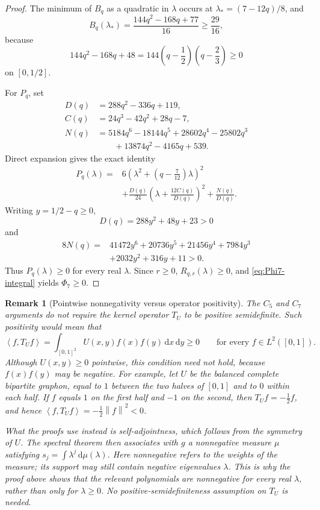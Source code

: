 \documentclass[11pt]{article}
\newtheorem{remark}[theorem]{Remark}
\newcommand{\ip}[2]{\left\langle #1,#2\right\rangle}
\newcommand{\norm}[1]{\left\lVert #1\right\rVert}
\newcommand{\dd}{\,\mathrm d}
\begin{document}
\begin{proof}
The minimum of \(B_q\) as a quadratic in \(\lambda\) occurs at
\(\lambda_*=(7-12q)/8\), and
\[
 B_q(\lambda_*)=\frac{144q^2-168q+77}{16}\ge\frac{29}{16},
\]
because
\[
 144q^2-168q+48=144\left(q-\frac12\right)
                         \left(q-\frac23\right)\ge0
\]
on \([0,1/2]\).

For \(P_q\), set
\begin{align*}
 D(q)&=288q^2-336q+119,\\
 C(q)&=24q^3-42q^2+28q-7,\\
 N(q)&=5184q^6-18144q^5+28602q^4-25802q^3\\
     &\qquad+13874q^2-4165q+539.
\end{align*}
Direct expansion gives the exact identity
\begin{equation}\label{eq:Pq-SOS}
\begin{aligned}
 P_q(\lambda)
 ={}&6\left(\lambda^2+\left(q-\frac7{12}\right)\lambda\right)^2\\
 &+\frac{D(q)}{24}
   \left(\lambda+\frac{12C(q)}{D(q)}\right)^2
 +\frac{N(q)}{D(q)}.
\end{aligned}
\end{equation}
Writing \(y=1/2-q\ge0\),
\[
       D(q)=288y^2+48y+23>0
\]
and
\[
\begin{aligned}
 8N(q)={}&41472y^6+20736y^5+21456y^4+7984y^3\\
         &+2032y^2+316y+11>0.
\end{aligned}
\]
Thus \(P_q(\lambda)\ge0\) for every real \(\lambda\).  Since
\(r\ge0\), \(R_{q,r}(\lambda)\ge0\), and \eqref{eq:Phi7-integral} yields
\(\Phi_7\ge0\).
\end{proof}

\begin{remark}[Pointwise nonnegativity versus operator positivity]
The \(C_5\) and \(C_7\) arguments do not require the kernel operator \(T_U\)
to be positive semidefinite.  Such positivity would mean that
\[
 \ip f{T_Uf}
 =\int_{[0,1]^2}U(x,y)f(x)f(y)\dd x\dd y\ge0
 \qquad\text{for every }f\in L^2([0,1]).
\]
Although \(U(x,y)\ge0\) pointwise, this condition need not hold, because
\(f(x)f(y)\) may be negative.  For example, let \(U\) be the balanced
complete bipartite graphon, equal to \(1\) between the two halves of
\([0,1]\) and to \(0\) within each half.  If \(f\) equals \(1\) on the first
half and \(-1\) on the second, then \(T_Uf=-\tfrac12f\), and hence
\(\ip f{T_Uf}=-\tfrac12\norm f^2<0\).

What the proofs use instead is self-adjointness, which follows from the
symmetry of \(U\).  The spectral theorem then associates with \(g\) a
nonnegative measure \(\mu\) satisfying \(s_j=\int\lambda^j\dd\mu(\lambda)\).
Here nonnegative refers to the weights of the measure; its support may still
contain negative eigenvalues \(\lambda\).  This is why the proof above shows
that the relevant polynomials are nonnegative for every real \(\lambda\),
rather than only for \(\lambda\ge0\).  No positive-semidefiniteness assumption
on \(T_U\) is needed.
\end{remark}
\end{document}
